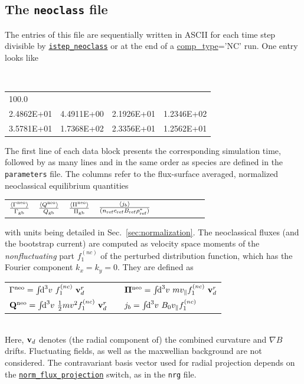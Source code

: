 \documentclass[12pt]{article}
\begin{document}
\subsection{The \texttt{neoclass} file}
\label{subsec:neoclass-file}
The entries of this file are sequentially written in ASCII for each time step divisible by 
\hyperlink{istep_neoclass}{\tt istep\_neoclass} or at the end of a \hyperlink{comp_type}{\rm comp\_type}='NC' run.
One entry looks like
\begin{center}
\scriptsize \tt
\begin{tabular}{llll}
100.0 & & & \\
2.4862E+01 & 4.4911E+00 & 2.1926E+01 & 1.2346E+02 \\
3.5781E+01 & 1.7368E+02 & 2.3356E+01 & 1.2562E+01 
\end{tabular}
\end{center}
The first line of each data block presents the corresponding simulation time, 
followed by as many lines and in the same order as species are defined in
the {\tt parameters} file. The columns refer to the flux-surface averaged, 
normalized neoclassical equilibrium quantities\\[-2ex]
\begin{center}
\begin{tabular}{*{10}{c}} %
$\frac{\langle \Gamma^{\rm neo} \rangle}{\Gamma_{\rm gb}}$ & $\frac{\langle Q^{\rm neo} \rangle}{Q_{\rm gb}}$ & 
$\frac{{\langle \Pi^{\rm neo} \rangle}}{\Pi_{\rm gb}}$ & $\frac{{\langle j_b \rangle}}{(n_{{\rm ref}} c_{{\rm ref}} B_{{\rm ref}} \rho_{\rm ref}^*)}$ \\ 
\end{tabular}
\end{center}
with units being detailed in Sec.~\ref{sec:normalization}.
The neoclassical fluxes (and the bootstrap current) are computed as velocity space moments of the
{\em nonfluctuating} part $f_1^{(nc)}$ of the perturbed distribution function,
which has the Fourier component $k_x=k_y=0$. They are defined as\\[1ex]
\begin{tabular}{lp{3em}l}
$\Gamma^{\rm neo} = \int\!\!\text{d}^3v\,\, f_1^{(nc)}\,\, \mathbf{v}^r_d$ & & 
$\mathbf{\Pi}^{\rm neo} = \int\!\!\text{d}^3v\,\, m v_{\|} f_1^{(nc)}\,\, \mathbf{v}^r_d$ \\
$\mathbf{Q}^{\rm neo} = \int\!\!\text{d}^3v\,\, \frac{1}{2}m v^2 f_1^{(nc)}\,\, \mathbf{v}^r_d$ & & 
$j_{b} = \int\!\!\text{d}^3v\,\,B_0v_\| f_1^{(nc)}$ 
\end{tabular}\\[1ex]
Here, $\mathbf{v}_d$ denotes (the radial component of) the combined curvature and $\nabla B$ drifts.
Fluctuating fields, as well as the maxwellian background are not
considered.
The contravariant basis vector used for radial projection depends on 
the \hyperlink{norm_flux_projection}{\tt norm\_flux\_projection} switch, as in the {\tt nrg} file.
\end{document}
